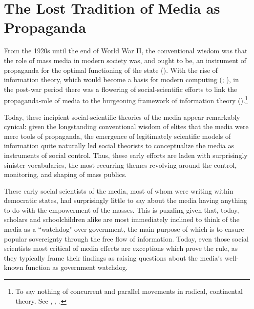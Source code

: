 \documentclass[12pt]{report}
\begin{document}
\section{The Lost Tradition of Media as Propaganda}

From the 1920s until the end of World War II, the conventional wisdom
was that the role of mass media in modern society was, and ought to
be, an instrument of propaganda for the optimal functioning of the
state (\citealt{Bernays:2004vo, lippmann1932public}).
With the rise of information theory, which would become a basis for
modern computing (\citealt{Shannon:2013iy}; \citealt{gleick2011information}),
in the post-war period there was a flowering of social-scientific
efforts to link the propaganda-role of media to the burgeoning framework
of information theory (\citealt{wiener1965cybernetics, Deutsch:1953ww, Deutsch:1966ux, McLuhan:1994tf, Ellul:1965uf}).\footnote{To say nothing of concurrent and parallel movements in radical, continental theory. See \citet{Horkheimer:2009te}, \citet{adorno2001culture},
\citet{Debord:1967vn}. %
}

Today, these incipient social-scientific theories of the media appear
remarkably cynical: given the longstanding conventional wisdom of
elites that the media were mere tools of propaganda, the emergence
of legitimately scientific models of information quite naturally led
social theorists to conceptualize the media as instruments of social
control. Thus, these early efforts are laden with surprisingly sinister
vocabularies, the most recurring themes revolving around the control,
monitoring, and shaping of mass publics. 

These early social scientists of the media, most of whom were writing
within democratic states, had surprisingly little to say about the
media having anything to do with the empowerment of the masses. This
is puzzling given that, today, scholars and schoolchildren alike are
most immediately inclined to think of the media as a ``watchdog"
over government, the main purpose of which is to ensure popular sovereignty
through the free flow of information. Today, even those social scientists
most critical of media effects are exceptions which prove the rule,
as they typically frame their findings as raising questions about
the media's well-known function as government watchdog.
\end{document}
